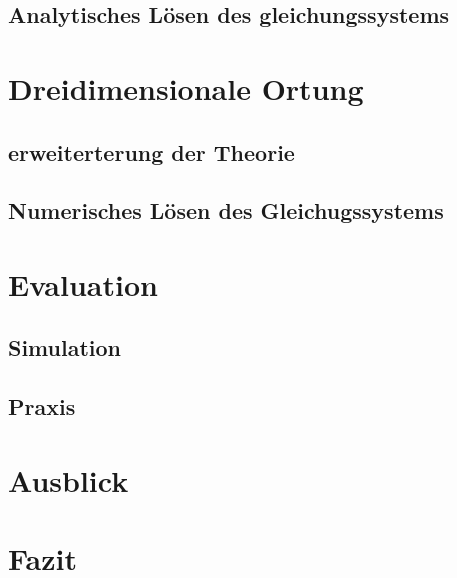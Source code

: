 \documentclass[10pt,a4paper]{article}
\begin{document}
      \subsection{Analytisches Lösen des gleichungssystems}
  \section{Dreidimensionale Ortung} 
      \subsection{erweiterterung der Theorie}
      \subsection{Numerisches Lösen des Gleichugssystems}
  \section{Evaluation} 
      \subsection{Simulation}
      \subsection{Praxis}
  \section{Ausblick} 
  \section{Fazit} 
  
  \pagebreak %
  \setcounter{page}{1}
  \printbibliography
\end{document}
